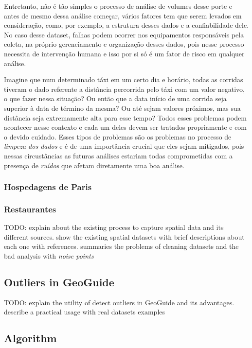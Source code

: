 Entretanto, não é tão simples o processo de análise de volumes desse porte e antes de mesmo dessa análise começar, vários fatores tem que serem levados em consideração, como, por exemplo, a estrutura desses dados e a confiabilidade dele. No caso desse dataset, falhas podem ocorrer nos equipamentos responsáveis pela coleta, na próprio gerenciamento e organização desses dados, pois nesse processo necessita de intervenção humana e isso por si só é um fator de risco em qualquer análise.

Imagine que num determinado táxi em um certo dia e horário, todas as corridas tiveram o dado referente a distância percorrida pelo táxi com um valor negativo, o que fazer nessa situação? Ou então que a data início de uma corrida seja superior à data de término da mesma? Ou até sejam valores próximos, mas sua distância seja extremamente alta para esse tempo? Todos esses problemas podem acontecer nesse contexto e cada um deles devem ser tratados propriamente e com o devido cuidado. Esses tipos de problemas são os problemas no processo de \textit{limpeza dos dados} e é de uma importância crucial que eles sejam mitigados, pois nessas circustâncias as futuras análises estariam todas comprometidas com a presença de \textit{ruídos} que afetam diretamente uma boa análise.

\subsubsection{Hospedagens de Paris}
\subsubsection{Restaurantes}

TODO: explain about the existing process to capture spatial data and its different sources. show the existing spatial datasets with brief descriptions about each one with references. summaries the problems of cleaning datasets and the bad analysis with \textit{noise points}

\subsection{Outliers in GeoGuide}

TODO: explain the utility of detect outliers in GeoGuide and its advantages. describe a practical usage with real datasets examples

\subsection{Algorithm}

